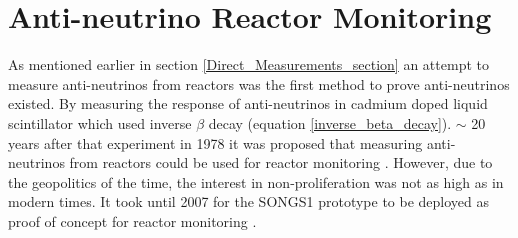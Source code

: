 \section{Anti-neutrino Reactor Monitoring}
As mentioned earlier in section \ref{Direct_Measurements_section} an attempt to measure anti-neutrinos from reactors was the first method to prove anti-neutrinos existed. By measuring the response of anti-neutrinos in cadmium doped liquid scintillator \cite{Cowan1956Confirmation} which used inverse $\beta$ decay (equation \ref{inverse_beta_decay}). $\sim$ 20 years after that experiment in 1978 it was proposed that measuring anti-neutrinos from reactors could be used for reactor monitoring \cite{Borovoi_1978}. However, due to the geopolitics of the time, the interest in non-proliferation was not as high as in modern times. It took until 2007 for the SONGS1 prototype to be deployed as proof of concept for reactor monitoring \cite{Bowden_2007}. 
